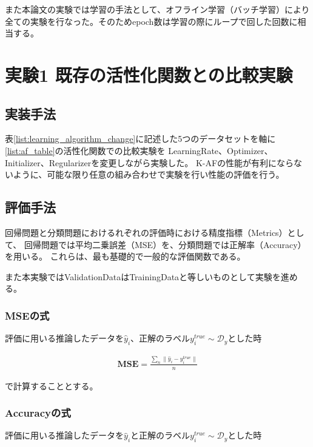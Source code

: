 また本論文の実験では学習の手法として、オフライン学習（バッチ学習）により全ての実験を行なった。そのためepoch数は学習の際にループで回した回数に相当する。



\section{実験1 既存の活性化関数との比較実験}
\label{exp1}
\subsection{実装手法}

表\ref{list:learning_algorithm_change}に記述した5つのデータセットを軸に\ref{list:af_table}の活性化関数での比較実験を
LearningRate、Optimizer、Initializer、Regularizerを変更しながら実験した。
K-AFの性能が有利にならないように、可能な限り任意の組み合わせで実験を行い性能の評価を行う。



\subsection{評価手法}

回帰問題と分類問題におけるれぞれの評価時における精度指標（Metrics）として、
回帰問題では平均二乗誤差（MSE）を、分類問題では正解率（Accuracy）を用いる。
これらは、最も基礎的で一般的な評価関数である。

また本実験ではValidationDataはTrainingDataと等しいものとして実験を進める。


\subsubsection{MSEの式}


評価に用いる推論したデータを$ \hat{y}_i $、正解のラベル$ y_i^{true} \sim \mathcal{D}_y $とした時

\begin{eqnarray}
\mathbf{MSE} = \frac{\sum_n \| \hat{y}_i - y_i^{true}\|}{n}
\label{eq:accuracy}
\end{eqnarray}

で計算することとする。


\subsubsection{Accuracyの式}

評価に用いる推論したデータを$ \hat{y}_i $と正解のラベル$ y_i^{true} \sim \mathcal{D}_y $とした時

